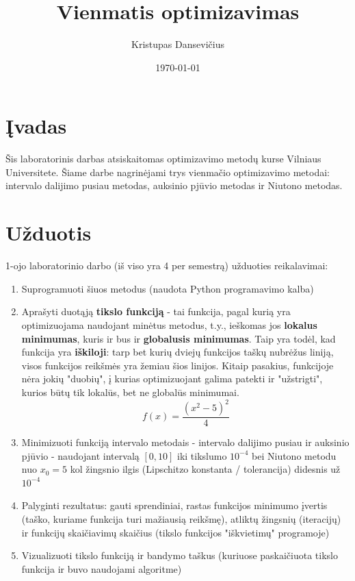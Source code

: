 \documentclass[lithuanian,a4paper,12pt]{article}
\title{Vienmatis optimizavimas}
\author{Kristupas Dansevičius}
\date{\today}
\begin{document}
\maketitle
\tableofcontents

\section{Įvadas}
Šis laboratorinis darbas atsiskaitomas optimizavimo metodų kurse Vilniaus Universitete. 
Šiame darbe nagrinėjami trys vienmačio optimizavimo metodai:
intervalo dalijimo pusiau metodas, auksinio pjūvio metodas ir Niutono metodas. 

\section{Užduotis}
1-ojo laboratorinio darbo (iš viso yra 4 per semestrą) užduoties reikalavimai:
\begin{enumerate}
    \item Suprogramuoti šiuos metodus (naudota Python programavimo kalba)
    \item Aprašyti duotąją \textbf{tikslo funkciją} - tai funkcija, pagal kurią yra optimizuojama naudojant minėtus metodus, t.y., ieškomas jos \textbf{lokalus minimumas}, kuris ir bus ir \textbf{globalusis minimumas}. Taip yra todėl, kad funkcija yra \textbf{iškiloji}: tarp bet kurių dviejų funkcijos taškų nubrėžus liniją, visos funkcijos reikšmės yra žemiau šios linijos. Kitaip pasakius, funkcijoje nėra jokių "duobių", į kurias optimizuojant galima patekti ir "užstrigti", kurios būtų tik lokalūs, bet ne globalūs minimumai.  
        \begin{equation}
            f(x) = \frac{(x^2 - 5)^2}{4}
        \end{equation}
    \item Minimizuoti funkciją intervalo metodais - intervalo dalijimo pusiau ir auksinio pjūvio - naudojant intervalą $[0,10]$ iki tikslumo $10^{-4}$ bei Niutono metodu nuo $x_0 = 5$ kol žingsnio ilgis (Lipschitzo konstanta / tolerancija) didesnis už $10^{-4}$
    \item Palyginti rezultatus: gauti sprendiniai, rastas funkcijos minimumo įvertis (taško, kuriame funkcija turi mažiausią reikšmę), atliktų žingsnių (iteracijų) ir funkcijų skaičiavimų skaičius (tikslo funkcijos "iškvietimų" programoje)
    \item Vizualizuoti tikslo funkciją ir bandymo taškus (kuriuose paskaičiuota tikslo funkcija ir buvo naudojami algoritme)
\end{enumerate}
\end{document}
